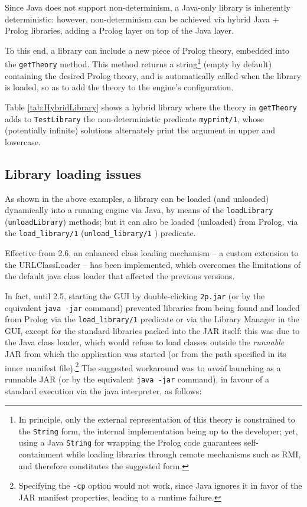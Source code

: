 Since Java does not support non-determinism, a Java-only library is inherently
deterministic: however, non-determinism can be achieved via hybrid Java + Prolog
libraries, adding a %
Prolog layer on top of the %
Java layer.

To this end, a library can include a new piece of Prolog theory, embedded into the \texttt{getTheory} method.
%
This method returns a string\footnote{%
    In principle, only the external representation of this theory is constrained to the \texttt{String} form, the internal implementation being up to the developer; yet, using a Java \texttt{String} for wrapping the Prolog code guarantees self-containment while loading libraries through remote mechanisms such as RMI, and therefore constitutes the suggested form.
} (empty by default) containing the desired Prolog theory, and is automatically called when the library is loaded, so as to add the theory to the engine's configuration.

Table \ref{tab:HybridLibrary} shows a hybrid library where the theory in \texttt{getTheory} adds to \texttt{TestLibrary} the non-deterministic predicate \texttt{myprint/1}, whose (potentially infinite) solutions alternately print the argument in upper and lowercase.

\subsection{Library loading issues}
\label{ssec:library-loading-issues}

As shown in the above examples, a library can be loaded (and unloaded) dynamically into a running engine via Java, by means of the \texttt{loadLibrary} (\texttt{unloadLibrary}) methods; but it can also be loaded (unloaded) from Prolog, via the \texttt{load\_library/1} (\texttt{unload\_library/1} ) predicate.

Effective from \tuprolog{} 2.6, an enhanced class loading mechanism -- a custom extension to the URLClassLoader -- has been implemented, which overcomes the limitations of the default java class loader that affected the previous \tuprolog{} versions.

In fact, until \tuprolog{} 2.5, starting the \tuprolog{} GUI by double-clicking \texttt{2p.jar} (or by the equivalent \texttt{java -jar} command) prevented libraries from being found and loaded from Prolog via the \texttt{load\_library/1} predicate or via the Library Manager in the GUI, except for the standard libraries packed into the \tuprolog{} JAR itself: this was due to the Java class loader, which would refuse to load classes outside the \textit{runnable} JAR from which the application was started (or from the path specified in its inner manifest file).\footnote{Specifying the \texttt{-cp} option would not work, since Java ignores it in favor of the JAR manifest properties, leading to a runtime failure.}
The suggested workaround was to \textit{avoid} launching \tuprolog{} as a runnable JAR (or by the equivalent \texttt{java -jar} command), in favour of a standard execution via the java interpreter, as follows:\\

